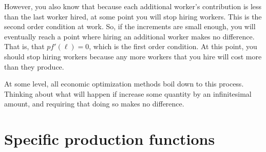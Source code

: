 However, you also know that because each additional worker's contribution is less than the last worker hired, at some point you will stop hiring workers. This is the second order condition at work. So, if the increments are small enough, you will eventually reach a point where hiring an additional worker makes no difference. That is, that $p f'(\ell) = 0$, which is the first order condition. At this point, you should stop hiring workers because any more workers that you hire will cost more than they produce. 

At some level, all economic optimization methods boil down to this process. Thinking about what will happen if increase some quantity by an infinitesimal amount, and requiring that doing so makes no difference. 

\section{Specific production functions}
